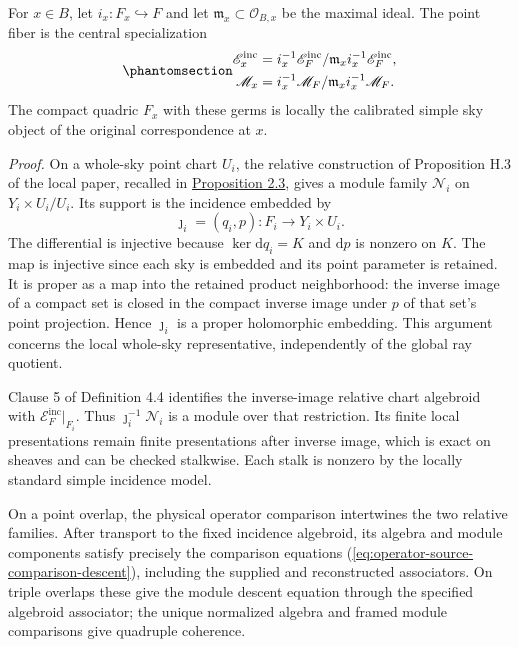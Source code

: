 \documentclass[
  english,
  11pt,
  reqno]{amsart}
\begin{document}
For \(x\in B\), let \(i_x:F_x\hookrightarrow F\) and let
\(\mathfrak m_x\subset\mathcal O_{B,x}\) be the maximal ideal. The point
fiber is the central specialization
\begin{equation}\protect\phantomsection\label{eq:incidence-point-module-specialization}{
\begin{aligned}
\mathscr E_x^{\mathrm{inc}}
&=i_x^{-1}\mathscr E_F^{\mathrm{inc}}
  /\mathfrak m_x i_x^{-1}\mathscr E_F^{\mathrm{inc}},\\
\mathscr M_x
&=i_x^{-1}\mathscr M_F
  /\mathfrak m_x i_x^{-1}\mathscr M_F.
\end{aligned}
}\end{equation} The compact quadric \(F_x\) with these germs is locally
the calibrated simple sky object of the original correspondence at
\(x\).

\emph{Proof.} On a whole-sky point chart \(U_i\), the relative
construction of Proposition H.3 of the local paper, recalled in
\hyperref[prop:independent-local-operator-input]{Proposition 2.3}, gives
a module family \(\mathcal N_i\) on \(Y_i\times U_i/U_i\). Its support
is the incidence embedded by \[
\jmath_i=(q_i,p):F_i\longrightarrow Y_i\times U_i.
\] The differential is injective because \(\ker\mathrm dq_i=K\) and
\(\mathrm dp\) is nonzero on \(K\). The map is injective since each sky
is embedded and its point parameter is retained. It is proper as a map
into the retained product neighborhood: the inverse image of a compact
set is closed in the compact inverse image under \(p\) of that set's
point projection. Hence \(\jmath_i\) is a proper holomorphic embedding.
This argument concerns the local whole-sky representative, independently
of the global ray quotient.

Clause 5 of Definition 4.4 identifies the inverse-image relative chart
algebroid with \(\mathscr E_F^{\mathrm{inc}}|_{F_i}\). Thus
\(\jmath_i^{-1}\mathcal N_i\) is a module over that restriction. Its
finite local presentations remain finite presentations after inverse
image, which is exact on sheaves and can be checked stalkwise. Each
stalk is nonzero by the locally standard simple incidence model.

On a point overlap, the physical operator comparison intertwines the two
relative families. After transport to the fixed incidence algebroid, its
algebra and module components satisfy precisely the comparison equations
(\ref{eq:operator-source-comparison-descent}), including the supplied
and reconstructed associators. On triple overlaps these give the module
descent equation through the specified algebroid associator; the unique
normalized algebra and framed module comparisons give quadruple
coherence.
\end{document}
